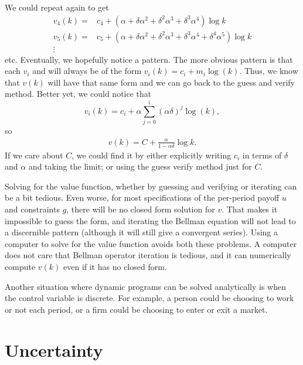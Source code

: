 \begin{example}
  We could repeat again to get 
  \begin{align*}
    v_4(k) = & c_4 + (\alpha + \delta \alpha^2 + \delta^2 \alpha^3 +
    \delta^3 \alpha^4) \log k \\
    v_5(k) = & c_5 + (\alpha + \delta \alpha^2 + \delta^2 \alpha^3 +
    \delta^3 \alpha^4 + \delta^4 \alpha^5) \log k \\
    \vdots
  \end{align*}
  etc. Eventually, we hopefully notice a pattern. The more obvious
  pattern is that each $v_i$ and will always be of the form $v_i(k) =
  c_i + m_i \log(k)$. Thus, we know that $v(k)$ will have that same
  form and we can go back to the guess and verify method. Better yet,
  we could notice that
  \[ v_i(k) = c_i + \alpha \sum_{j = 0}^i (\alpha \delta)^j \log(k),\]
  so 
  \begin{align*}
    v(k) = C + \frac{\alpha}{1-\alpha \delta} \log k.
  \end{align*}
  If we care about $C$, we could find it by either explicitly writing
  $c_i$ in terms of $\delta$ and $\alpha$ and taking the limit; or
  using the guess verify method just for $C$. 
\end{example}

Solving for the value function, whether by guessing and verifying or
iterating can be a bit tedious. Even worse, for most specifications of
the per-period payoff $u$ and constraints $g$, there will be no closed
form solution for $v$. That makes it impossible to guess the form, and
iterating the Bellman equation will not lead to a discernible pattern
(although it will still give a convergent series). Using a computer to
solve for the value function avoids both these problems. A computer
does not care that Bellman operator iteration is tedious, and it can
numerically compute $v(k)$ even if it has no closed form. 

Another situation where dynamic programs can be solved analytically is
when the control variable is discrete. For example, a person could be
choosing to work or not each period, or a firm could be choosing to
enter or exit a market. 

\begin{example}
  
\end{example}

\section{Uncertainty}


\clearpage




